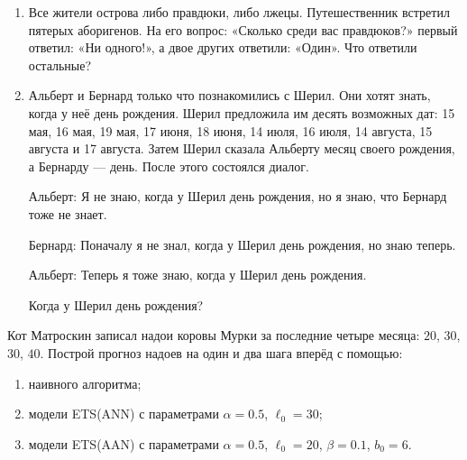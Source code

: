 \documentclass[12pt]{article} %
\begin{document}
\begin{enumerate}
    \item Все жители острова либо правдюки, либо лжецы. Путешественник встретил пятерых аборигенов. 
    На его вопрос: «Сколько среди вас правдюков?» первый ответил: «Ни одного!», а двое других ответили: «Один». 
    Что ответили остальные?

    \item Альберт и Бернард только что познакомились с Шерил. Они хотят знать, когда у неё день рождения. 
    Шерил предложила им десять возможных дат: 15 мая, 16 мая, 19 мая, 17 июня, 18 июня, 14 июля, 16 июля, 14 августа, 15 августа и 17 августа. 
    Затем Шерил сказала Альберту месяц своего рождения, а Бернарду — день. После этого состоялся диалог.
    
    Альберт: Я не знаю, когда у Шерил день рождения, но я знаю, что Бернард тоже не знает.
    
    Бернард: Поначалу я не знал, когда у Шерил день рождения, но знаю теперь.
    
    Альберт: Теперь я тоже знаю, когда у Шерил день рождения. 
    
    Когда у Шерил день рождения?
    
  
    


\end{enumerate}


\newpage
{}

Кот Матроскин записал надои коровы Мурки за последние четыре месяца: $20$, $30$, $30$, $40$. 
Построй прогноз надоев на один и два шага вперёд с помощью:

\begin{enumerate}
    \item наивного алгоритма;
    \item модели ETS(ANN) с параметрами $\alpha = 0.5$, $\ell_0 = 30$;
    \item модели ETS(AAN) с параметрами $\alpha = 0.5$, $\ell_0 = 20$, $\beta = 0.1$, $b_0 = 6$.
\end{enumerate}
\end{document}
